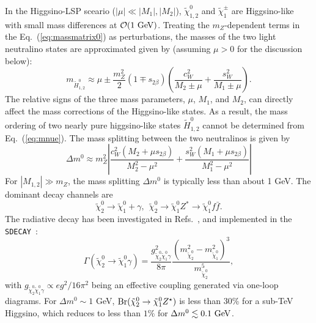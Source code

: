 \documentclass[
    prl,
    twocolumn,
    superscriptaddress,
    nofootinbib,
    amsmath, amssymb,
    aps,
    reprint,
    floatfix
]{revtex4-2}
\newcommand{\Shufang}[1]{\textcolor{red} {SS: #1}}
\newcommand{\px}[1]{\textcolor{blue} {PX: {\bf Comment:} {\it #1}}}
\begin{document}
In the Higgsino-LSP sceario ($|\mu| \ll |M_1|, |M_2|$), $\tilde{\chi}_{1,2}^0$ and $\tilde{\chi}_1^\pm$ are Higgsino-like with small mass differences at $\mathcal{O}(1~{\rm GeV})$. Treating the $m_Z$-dependent terms in the Eq.~(\ref{eq:massmatrix0}) as perturbations, the masses of the two light neutralino states are approximated given by (assuming \(\mu > 0\) for the discussion below):
\begin{equation}
\label{eq:mnue}
m_{\tilde{H}_{1,2}^0} \approx \mu \pm \frac{m_Z^2}{2}\left(1 \mp s_{2\beta} \right) \left(
\frac{c^2_W} { M_2 \pm \mu } + \frac{ s^2_W}{ M_1 \pm \mu } \right). 
\end{equation}
The relative signs of the three mass parameters, $\mu$, $M_1$, and $M_2$, can directly affect the mass corrections of the Higgsino-like states. As a result, the mass ordering of two nearly pure higgsino-like states $\tilde{H}_{1,2}^0$ cannot be determined from Eq.~(\ref{eq:mnue}). The mass splitting between the two neutralinos is given by  
% 
\begin{equation}
\label{eq:msplitn2n1}
\Delta m^0 \approx
m_Z^2 \left| \frac{c_W^2(M_2 + \mu s_{2\beta})}{M_2^2 - \mu^2} + \frac{s_W^2( M_1 + \mu s_{2\beta})}{M_1^2 - \mu^2 } \right|
\end{equation}
For $|M_{1,2}|\gg m_Z$,  the mass splitting $\Delta m^0 $ is typically less than about 1 GeV. The dominant decay channels are 
\begin{equation}
\tilde{\chi}_2^0 \to \tilde{\chi}_1^0 + \gamma,\ \ \tilde{\chi}_2^0 \to \tilde{\chi}_1^0 Z^* \to \tilde{\chi}_1^0 f\bar{f}.
\end{equation}
% 
The radiative decay has been investigated in Refs.~\cite{Haber:1988px, Gunion:1987yh, Ambrosanio:1995az, Ambrosanio:1996gz, Baer:2002kv}, and implemented in the \texttt{SDECAY}~\cite{Djouadi:2006bz}:
\begin{equation}
\label{eq:Gchi20}
	\Gamma(\tilde{\chi}_2^0 \to \tilde{\chi}_1^0 \gamma) = \frac{g_{\tilde{\chi}_2^0 \tilde{\chi}_1^0 \gamma}^2 }{8 \pi } \frac{\left( m_{\tilde{\chi}_2^0}^2 - m_{\tilde{\chi}_1^0}^2 \right)^3}{m_{\tilde{\chi}_2^0}^5},
\end{equation}
with $g_{\tilde{\chi}_2^0 \tilde{\chi}_1^0 \gamma} \propto e g^2 /16\pi^2 $  being an effective coupling generated via one-loop diagrams. 
For $\Delta m^0\sim 1$ GeV, ${\rm Br}(\tilde{\chi}_2^0 \rightarrow \tilde{\chi}_1^0 Z^\star)$ is less than  30\% for a sub-TeV Higgsino, which reduces to  less than $1\%$ for $\Delta m^0 \lesssim  0.1~{\rm GeV}$.
\end{document}
